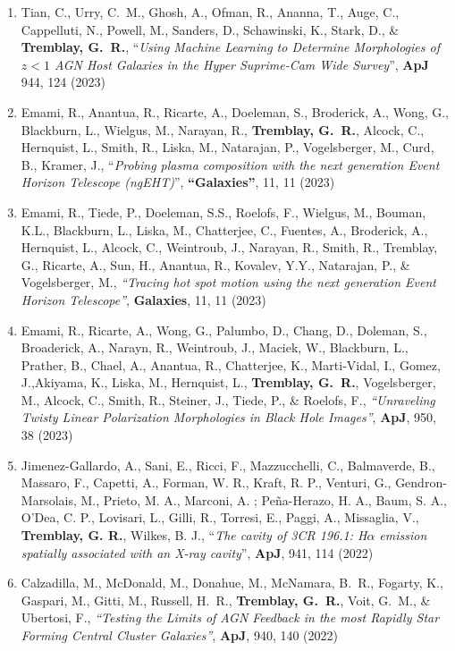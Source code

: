 \documentclass[11pt]{article}
\begin{document}
\begin{enumerate}[resume]
\item Tian, C., Urry, C.~M., Ghosh, A., Ofman, R., Ananna, T.,  Auge, C.,  Cappelluti, N.,  Powell, M., Sanders, D.,  Schawinski, K., Stark, D., \& \textbf{Tremblay, G.~R.}, ``\textit{Using Machine Learning to Determine Morphologies of  $z<1$  AGN Host Galaxies in the Hyper Suprime-Cam Wide Survey}'', \textbf{ApJ} 944, 124 (2023)

\item Emami, R., Anantua, R., Ricarte, A., Doeleman, S., Broderick, A., Wong, G.,  Blackburn, L.,  Wielgus, M.,  Narayan, R., \textbf{Tremblay, G.~R.}, Alcock, C., Hernquist, L., Smith, R., Liska, M., Natarajan, P.,  Vogelsberger, M.,  Curd, B., Kramer, J., ``\textit{Probing plasma composition with the next generation Event Horizon Telescope (ngEHT)}'', \textbf{``Galaxies''}, 11, 11 (2023)



\item Emami, R., Tiede, P., Doeleman, S.S., Roelofs, F., Wielgus, M., Bouman, K.L., Blackburn, L., Liska, M., Chatterjee, C., Fuentes, A., Broderick, A., Hernquist, L., Alcock, C., Weintroub, J., Narayan, R.,  Smith, R., Tremblay, G., Ricarte, A., Sun, H., Anantua, R., Kovalev, Y.Y., Natarajan, P., \& Vogelsberger, M., \textit{``Tracing hot spot motion using the next generation Event Horizon
Telescope''}, \textbf{Galaxies}, 11, 11 (2023)

\item Emami, R., Ricarte, A., Wong, G., Palumbo, D., Chang, D., Doleman, S., Broaderick, A., Narayn, R., Weintroub, J., Maciek, W., Blackburn, L., Prather, B., Chael, A., Anantua, R., Chatterjee, K., Marti-Vidal, I., Gomez, J.,Akiyama, K., Liska, M., Hernquist, L., \textbf{Tremblay, G.~R.}, Vogelsberger, M., Alcock, C., Smith, R., Steiner, J., Tiede, P., \& Roelofs, F., \textit{``Unraveling Twisty Linear Polarization Morphologies in Black Hole Images''}, \textbf{ApJ}, 950, 38 (2023)

\item Jimenez-Gallardo, A., Sani, E., Ricci, F., Mazzucchelli, C., Balmaverde, B., Massaro, F., Capetti, A., Forman, W. R., Kraft, R. P., Venturi, G., Gendron-Marsolais, M., Prieto, M. A., Marconi, A. ; Pe\~{n}a-Herazo, H. A., Baum, S. A., O'Dea, C. P., Lovisari, L., Gilli, R., Torresi, E., Paggi, A., Missaglia, V., \textbf{Tremblay, G. R.}, Wilkes, B. J., ``\textit{The cavity of 3CR 196.1: H$\alpha$ emission spatially associated with an X-ray cavity}'',  \textbf{ApJ}, 941, 114 (2022)


\item Calzadilla, M., McDonald, M., Donahue, M., McNamara, B.~R., Fogarty, K., Gaspari, M., Gitti, M., Russell, H.~R., \textbf{Tremblay, G.~R.}, Voit, G.~M., \& Ubertosi, F., \textit{``Testing the Limits of AGN Feedback in the most Rapidly Star Forming Central Cluster Galaxies''}, \textbf{ApJ}, 940, 140 (2022)


\end{enumerate}
\end{document}
